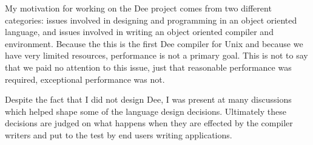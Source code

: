 My motivation for working on the Dee project comes from two different
categories: issues involved in designing and programming in an object
oriented language, and issues involved in writing an object oriented
compiler and environment.  Because the this is the first Dee compiler
for Unix and because we have very limited resources, performance is
not a primary goal.  This is not to say that we paid no attention to
this issue, just that reasonable performance was required, exceptional
performance was not.

Despite the fact that I did not design Dee, I was present at many
discussions which helped shape some of the language design decisions.
Ultimately these decisions are judged on what happens when they are
effected by the compiler writers and put to the test by end users
writing applications.
